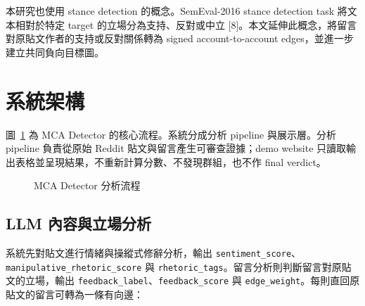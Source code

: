 \documentclass[conference]{IEEEtran}
\begin{document}
本研究也使用 stance detection 的概念。SemEval-2016 stance detection task 將文本相對於特定 target 的立場分為支持、反對或中立 [8]。本文延伸此概念，將留言對原貼文作者的支持或反對關係轉為 signed account-to-account edges，並進一步建立共同負向目標圖。

\section{系統架構}

圖~\ref{fig:pipeline} 為 MCA Detector 的核心流程。系統分成分析 pipeline 與展示層。分析 pipeline 負責從原始 Reddit 貼文與留言產生可審查證據；demo website 只讀取輸出表格並呈現結果，不重新計算分數、不發現群組，也不作 final verdict。

\begin{figure}[htbp]
  \centering
  \caption{MCA Detector 分析流程}
  \label{fig:pipeline}
\end{figure}

\subsection{LLM 內容與立場分析}

系統先對貼文進行情緒與操縱式修辭分析，輸出 \texttt{sentiment\_score}、\texttt{manipulative\_rhetoric\_score} 與 \texttt{rhetoric\_tags}。留言分析則判斷留言對原貼文的立場，輸出 \texttt{feedback\_label}、\texttt{feedback\_score} 與 \texttt{edge\_weight}。每則直回原貼文的留言可轉為一條有向邊：
\end{document}
